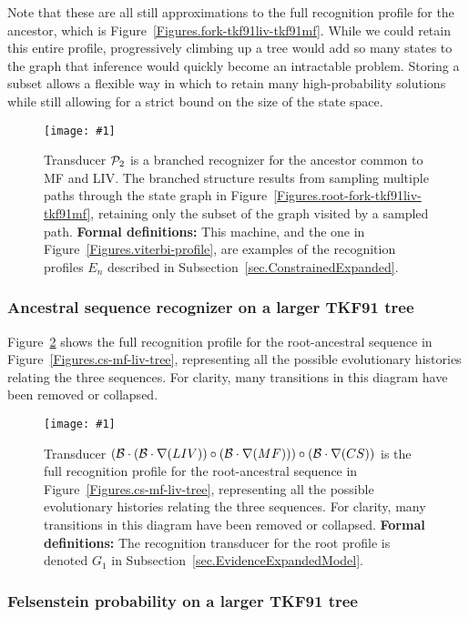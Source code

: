 \documentclass{article}
\newcommand{\secref}[1]{Subsection~\ref{sec.#1}}
\newcommand{\figref}[1]{Figure~\ref{Figures.#1}}
\newcommand{\figlabel}[1]{\label{Figures.#1}}
\newcommand{\easyfig}[4]{
\begin{figure}
\texttt{[image: \#1]}
\caption{ \figlabel{#3} #4}
\end{figure}}
\newcommand{\widepngfig}[2]{\easyfig{#1.png}{width=\textwidth}{#1}{#2}}
\newcommand{\tallpdffig}[2]{\easyfig{#1-fig.pdf}{height=.8\textheight}{#1}{#2}}
\newcommand{\needfig}[1]{{\bf Need figure: } #1 }
\newcommand\tkf{{\cal B}}
\newcommand\profile{{\cal P}}
\newcommand\formaldefs{{\bf Formal definitions: }}
\newcommand\fork{\circ}
\newcommand\recognize{\nabla}
\begin{document}
Note that these are all still approximations to the full
recognition profile for the ancestor, which is \figref{fork-tkf91liv-tkf91mf}.  
While we could retain this entire profile, progressively climbing up a tree
would add so many states to the graph that inference would quickly become an intractable
problem.  
Storing a subset allows a flexible way in which to retain many high-probability solutions
while still allowing for a strict bound on the size of the state space. 

\tallpdffig{forward2-profile}{Transducer $\profile_2$ is a branched recognizer for the 
ancestor common to MF and LIV.  The branched structure results from sampling
multiple paths through the state graph in \figref{root-fork-tkf91liv-tkf91mf}, 
retaining only the subset of the graph visited by a sampled path.
\formaldefs
This machine, and the one in \figref{viterbi-profile}, are examples of the recognition profiles $E_n$ described in \secref{ConstrainedExpanded}.  }

\subsubsection{Ancestral sequence recognizer on a larger TKF91 tree}

\figref{fork3-tkf91liv-tkf91mf-tkf91cs} 
shows  the full recognition profile for the 
root-ancestral sequence in \figref{cs-mf-liv-tree}, 
representing all the possible evolutionary histories relating the three sequences.  
For clarity, many transitions in this diagram have been removed or collapsed.

\widepngfig{fork3-tkf91liv-tkf91mf-tkf91cs}
{Transducer $(\tkf \cdot (\tkf \cdot \recognize(LIV))\fork(\tkf \cdot \recognize(MF)))\fork(\tkf \cdot \recognize(CS))$ 
is the full recognition profile for the root-ancestral sequence in \figref{cs-mf-liv-tree}, 
representing all the possible evolutionary histories relating the three sequences.  
For clarity, many transitions in this diagram have been removed or collapsed.
\formaldefs
The recognition transducer for the root profile is denoted $G_1$ in \secref{EvidenceExpandedModel}.
}

\subsubsection{Felsenstein probability on a larger TKF91 tree}
\end{document}
